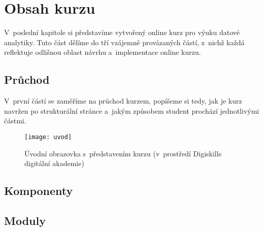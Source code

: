 \hypertarget{obsah-kurzu}{%
\chapter{Obsah kurzu}\label{obsah-kurzu}}

V~poslední kapitole si představíme vytvořený online kurz pro výuku datové analytiky. Tuto část dělíme do tří vzájemně provázaných částí, z~nichž každá reflektuje odlišnou oblast návrhu a~implementace online kurzu.

\hypertarget{prux16fchod}{%
\section{Průchod}\label{prux16fchod}}

V~první částí se zaměříme na průchod kurzem, popíšeme si tedy, jak je kurz navržen po strukturální stránce a~jakým způsobem student prochází jednotlivými částmi.

\begin{figure}[ht]   
    \centering
    \texttt{[image: uvod]}  
    \caption{Úvodní obrazovka s~představením kurzu (v~prostředí Digiskills digitální akademie)}
    \label{uvod}
\end{figure}

\hypertarget{komponenty}{%
\section{Komponenty}\label{komponenty}}

\hypertarget{moduly}{%
\section{Moduly}\label{moduly}}
